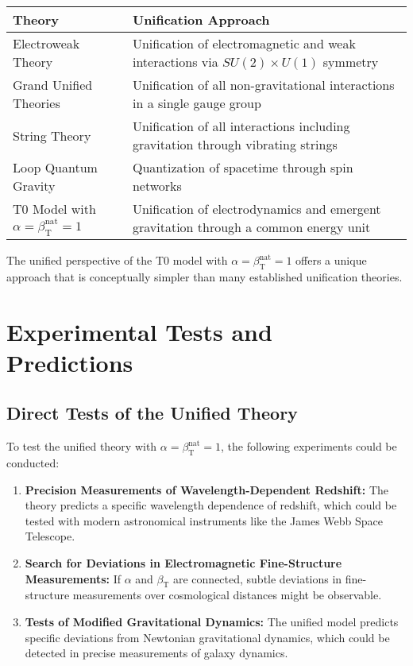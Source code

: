 ﻿\documentclass[12pt,a4paper]{article}
\newcommand{\betaT}{\beta_{\text{T}}}
\begin{document}
	\begin{tcolorbox}[colback=blue!5!white,colframe=blue!75!black,title=Comparison with Other Unification Theories]
		\begin{tabular}{>{\raggedright\arraybackslash}p{3cm}|>{\raggedright\arraybackslash}p{8cm}}
			\textbf{Theory} & \textbf{Unification Approach} \\
			\hline
			Electroweak Theory & Unification of electromagnetic and weak interactions via \(SU(2) \times U(1)\) symmetry \\
			\hline
			Grand Unified Theories & Unification of all non-gravitational interactions in a single gauge group \\
			\hline
			String Theory & Unification of all interactions including gravitation through vibrating strings \\
			\hline
			Loop Quantum Gravity & Quantization of spacetime through spin networks \\
			\hline
			T0 Model with \(\alpha = \betaT^{\text{nat}} = 1\) & Unification of electrodynamics and emergent gravitation through a common energy unit \\
		\end{tabular}
	\end{tcolorbox}
	
	The unified perspective of the T0 model with \(\alpha = \betaT^{\text{nat}} = 1\) offers a unique approach that is conceptually simpler than many established unification theories.
	
	\section{Experimental Tests and Predictions}
	
	\subsection{Direct Tests of the Unified Theory}
	
	To test the unified theory with \(\alpha = \betaT^{\text{nat}} = 1\), the following experiments could be conducted:
	
	\begin{enumerate}
		\item \textbf{Precision Measurements of Wavelength-Dependent Redshift:} The theory predicts a specific wavelength dependence of redshift, which could be tested with modern astronomical instruments like the James Webb Space Telescope.
		
		\item \textbf{Search for Deviations in Electromagnetic Fine-Structure Measurements:} If \(\alpha\) and \(\betaT\) are connected, subtle deviations in fine-structure measurements over cosmological distances might be observable.
		
		\item \textbf{Tests of Modified Gravitational Dynamics:} The unified model predicts specific deviations from Newtonian gravitational dynamics, which could be detected in precise measurements of galaxy dynamics.
	\end{enumerate}
	
\end{document}
